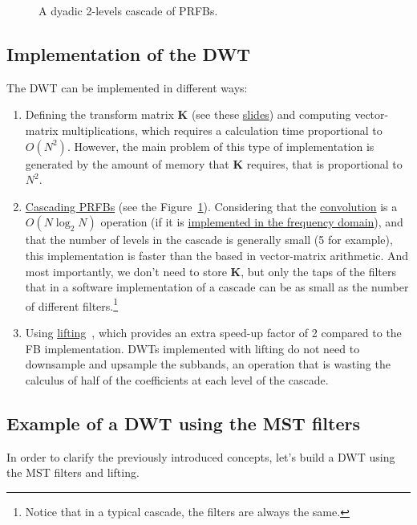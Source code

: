 \begin{figure}
  \centering
  \caption{A dyadic 2-levels cascade of PRFBs.}
  \label{fig:cascade}
\end{figure}

\subsection{Implementation of the DWT}
The DWT can be implemented in different ways:
\begin{enumerate}
\item Defining the transform matrix ${\mathbf K}$ (see these
  \href{https://cseweb.ucsd.edu/classes/fa17/cse166-a/lec13.pdf}{slides})
  and computing vector-matrix multiplications, which requires a
  calculation time proportional to $O(N^2)$. However, the main problem
  of this type of implementation is generated by the amount of memory
  that ${\mathbf K}$ requires, that is proportional to $N^2$.
\item
  \href{https://en.wikipedia.org/wiki/Discrete_wavelet_transform#Cascading_and_filter_banks}{Cascading
    PRFBs} (see the Figure~\ref{fig:cascade}). Considering that the
  \href{https://en.wikipedia.org/wiki/Convolution}{convolution} is a
  $O(N\log_2N)$ operation (if it is
  \href{https://en.wikipedia.org/wiki/Convolution_theorem}{implemented
    in the frequency domain}), and that the number of levels in the
  cascade is generally small (5 for example), this implementation is
  faster than the based in vector-matrix arithmetic. And most
  importantly, we don't need to store ${\mathbf K}$, but only the taps
  of the filters that in a software implementation of a cascade can be
  as small as the number of different filters.\footnote{Notice that in
    a typical cascade, the filters are always the same.}
\item Using
  \href{https://en.wikipedia.org/wiki/Lifting_scheme}{lifting}~\cite{sweldens1997building},
  which provides an extra speed-up factor of 2 compared to the FB
  implementation. DWTs implemented with lifting do not need to
  downsample and upsample the subbands, an operation that is wasting
  the calculus of half of the coefficients at each level of the
  cascade.
\end{enumerate}

\subsection{Example of a DWT using the MST filters}
In order to clarify the previously introduced concepts, let's build a
DWT using the MST filters and lifting.

